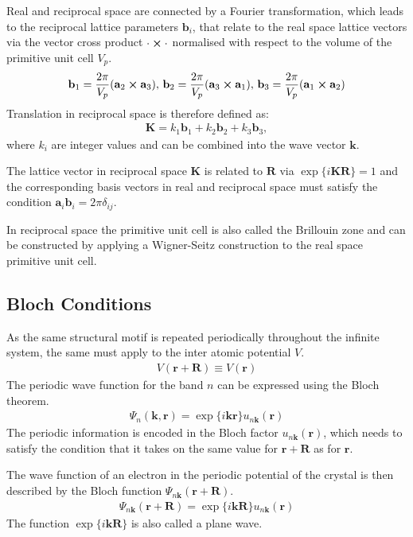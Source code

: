 Real and reciprocal space are connected by a Fourier transformation, which leads
to the reciprocal lattice parameters $\mathbf{b}_i$, that relate to the real space
lattice vectors via the vector cross product $\cdot\cross\cdot$ normalised with
respect to the volume of the primitive unit cell $V_p$.
%
\begin{align}
    \mathbf{b}_1=\frac{2\pi}{V_p}(\mathbf{a}_2\cross \mathbf{a}_3),\,\mathbf{b}_2=\frac{2\pi}{V_p}(\mathbf{a}_3\cross \mathbf{a}_1),\,\mathbf{b}_3=\frac{2\pi}{V_p}(\mathbf{a}_1\cross \mathbf{a}_2)
\end{align}
%
Translation in reciprocal space is therefore defined as:
%
\begin{align}
    \mathbf{K}=k_1\mathbf{b}_1+k_2\mathbf{b}_2+k_3\mathbf{b}_3,
\end{align}
%
where $k_i$ are integer values and can be combined into the wave vector $\mathbf{k}$.

The lattice vector in reciprocal space $\mathbf{K}$ is related to $\mathbf{R}$ via
$\exp\{i\mathbf{KR}\}=1$ and the corresponding basis vectors in real and
reciprocal space must satisfy the condition
$\mathbf{a}_i\mathbf{b}_i=2\pi\delta_{ij}$.

In reciprocal space the primitive unit cell is also called the Brillouin zone and
can be constructed by applying a Wigner-Seitz construction to the real space
primitive unit cell.

\subsection{Bloch Conditions}
\label{sec:BlochConditions}

As the same structural motif is repeated periodically throughout the infinite
system, the same must apply to the inter atomic potential $V$.
%
\begin{align}
    V(\mathbf{r}+\mathbf{R}) \equiv V(\mathbf{r})
\end{align}
%
The periodic wave function for the band $n$ can be expressed using the Bloch theorem.
%
\begin{align}
    \Psi_n(\mathbf{k},\mathbf{r})=\exp\{i\mathbf{k}\mathbf{r}\}u_{n\mathbf{k}}(\mathbf{r})
\end{align}
%
The periodic information is encoded in the Bloch factor
$u_{n\mathbf{k}}(\mathbf{r})$, which needs to satisfy the condition that it
takes on the same value for $\mathbf{r}+\mathbf{R}$ as for $\mathbf{r}$.

The wave function of an electron in the periodic potential of the crystal is
then described by the Bloch function
$\Psi_{n\mathbf{k}}(\mathbf{r}+\mathbf{R})$.
%
\begin{align}
    \Psi_{n\mathbf{k}}(\mathbf{r}+\mathbf{R})=\exp\{i\mathbf{kR}\}u_{n\mathbf{k}}(\mathbf{r})
\end{align}
%
The function $\exp\{i\mathbf{kR}\}$ is also called a plane wave.

